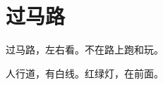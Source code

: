 \documentclass[12pt,UTF-8,openany]{ctexbook}
\begin{document}
\clearpage

\begin{center}
    
    
\end{center}


\hanzibox{}\hanzibox{}\hanzibox{}\hanzibox{}\hspace{1em}\hanzibox{}\hanzibox{}\hanzibox{}\hanzibox{}

\hanzibox{}\hanzibox{}\hanzibox{}\hanzibox{}\hspace{1em}\hanzibox{}\hanzibox{}\hanzibox{}\hanzibox{}

\hanzibox{}\hanzibox{}\hanzibox{}\hanzibox{}\hspace{1em}\hanzibox{}\hanzibox{}\hanzibox{}\hanzibox{}

\hanzibox{}\hanzibox{}\hanzibox{}\hanzibox{}\hspace{1em}\hanzibox{}\hanzibox{}\hanzibox{}\hanzibox{}






\chapter{过马路}

\begin{large}
    
    过马路，左右看。不在路上跑和玩。
    
    人行道，有白线。红绿灯，在前面。
    
\end{large}


\clearpage

\begin{center}
    
\end{center}


\hanzibox{}\hanzibox{}\hanzibox{}\hanzibox{}\hspace{1em}\hanzibox{}\hanzibox{}\hanzibox{}\hanzibox{}

\hanzibox{}\hanzibox{}\hanzibox{}\hanzibox{}\hspace{1em}\hanzibox{}\hanzibox{}\hanzibox{}\hanzibox{}
\end{document}
